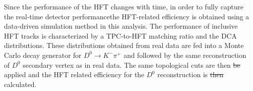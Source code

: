 \documentclass[%
 reprint,	
 amsmath,amssymb,
 aps,
 prc,
]{revtex4-1}
\providecommand{\DIFaddtex}[1]{{\protect\color{blue}\uwave{#1}}} %
\providecommand{\DIFdeltex}[1]{{\protect\color{red}\sout{#1}}}                      %
\providecommand{\DIFaddbegin}{} %
\providecommand{\DIFaddend}{} %
\providecommand{\DIFdelbegin}{} %
\providecommand{\DIFdelend}{} %
\providecommand{\DIFadd}[1]{\texorpdfstring{\DIFaddtex{#1}}{#1}} %
\providecommand{\DIFdel}[1]{\texorpdfstring{\DIFdeltex{#1}}{}} %
\begin{document}
\DIFaddend Since the performance of the HFT changes with time, in order to fully capture the real-time detector performance\DIFaddbegin \DIFadd{, }\DIFaddend the HFT-related efficiency is obtained using a data-driven simulation method in this analysis. The performance of inclusive HFT tracks is characterized by a TPC-to-HFT matching ratio and the DCA distributions. These distributions obtained from real data are fed into a Monte Carlo decay generator for $D^0\rightarrow K^-\pi^+$ and followed by the same reconstruction of $D^0$ secondary vertex as in real data. The same topological cuts are then \DIFdelbegin \DIFdel{be }\DIFdelend applied and the HFT related efficiency for the $D^0$ reconstruction is \DIFdelbegin \DIFdel{then }\DIFdelend calculated.



\end{document}
